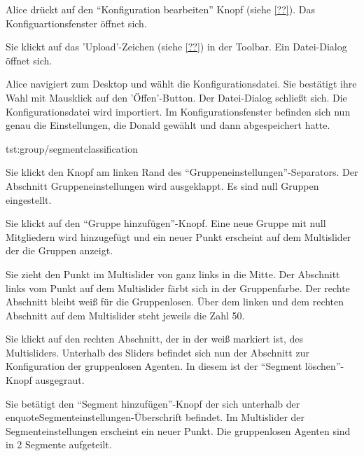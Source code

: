\documentclass[parskip=full,11pt]{scrartcl}
\begin{document}
{Alice drückt auf den \enquote{Konfiguration bearbeiten} Knopf (siehe \cref{??}).}
{Das Konfiguartionsfenster öffnet sich.}

{Sie klickt auf das 'Upload'-Zeichen (siehe \cref{??}) in der Toolbar.}
{Ein Datei-Dialog öffnet sich.}

{Alice navigiert zum Desktop und wählt die Konfigurationsdatei. Sie bestätigt ihre Wahl mit Mausklick auf den 'Öffen'-Button.}
{Der Datei-Dialog schließt sich. Die Konfigurationsdatei wird importiert. Im Konfigurationsfenster befinden sich nun genau die Einstellungen, die Donald gewählt und dann abgespeichert hatte.}

{tst:group/segmentclassification}

{Sie klickt den Knopf am linken Rand des \enquote{Gruppeneinstellungen}-Separators.}
{Der Abschnitt Gruppeneinstellungen wird ausgeklappt. Es sind null Gruppen eingestellt.}

{Sie klickt auf den \enquote{Gruppe hinzufügen}-Knopf.}
{Eine neue Gruppe mit null Mitgliedern wird hinzugefügt und ein neuer Punkt erscheint auf dem Multislider der die Gruppen anzeigt.}

{Sie zieht den Punkt im Multislider von ganz links in die Mitte.}
{Der Abschnitt links vom Punkt auf dem Multislider färbt sich in der Gruppenfarbe. Der rechte Abschnitt bleibt weiß für die Gruppenlosen. Über dem linken und dem rechten Abschnitt auf dem Multislider steht jeweils die Zahl 50.}

{Sie klickt auf den rechten Abschnitt, der in der weiß markiert ist, des Multisliders.}
{Unterhalb des Sliders befindet sich nun der Abschnitt zur Konfiguration der gruppenlosen Agenten. In diesem ist der \enquote{Segment löschen}-Knopf ausgegraut.}

{Sie betätigt den \enquote{Segment hinzufügen}-Knopf der sich unterhalb der enquote{Segmenteinstellungen}-Überschrift befindet.}
{Im Multislider der Segmenteinstellungen erscheint ein neuer Punkt. Die gruppenlosen Agenten sind in 2 Segmente aufgeteilt.}
\end{document}
